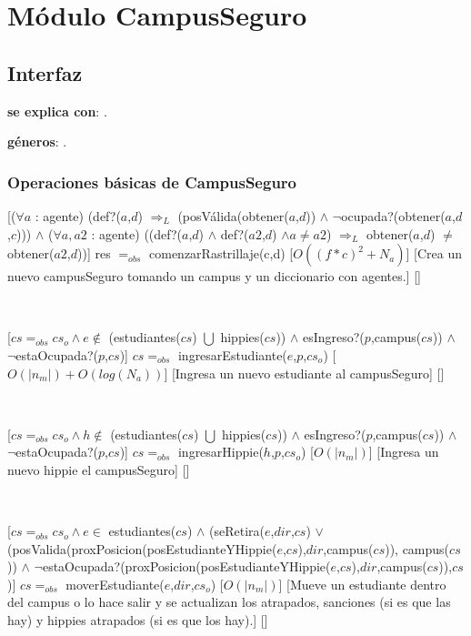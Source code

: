 \section{Módulo CampusSeguro}

\subsection{Interfaz}

\textbf{se explica con}: .

\textbf{géneros}: .

\subsubsection{Operaciones básicas de CampusSeguro}

[($\forall a$ : agente) (def?($a$,$d$) $\Rightarrow_L$ (posVálida(obtener($a$,$d$)) $\land$ $\neg$ocupada?(obtener($a$,$d$,$c$))) $\land$ ($\forall a, a2$ : agente) ((def?($a$,$d$) $\land$ def?($a2$,$d$) $\land a \neq a2$) $\Rightarrow_L$ obtener($a$,$d$) $\neq$ obtener($a2$,$d$))]
{res $=_{obs}$ comenzarRastrillaje(c,d)}
[$O((f*c)^2 + N_a)$]
[Crea un nuevo campusSeguro tomando un campus y un diccionario con agentes.]
[]

~

[$cs =_{obs} cs_o \land e \not\in$ (estudiantes($cs$) $\bigcup$ hippies($cs$)) $\land$ esIngreso?($p$,campus($cs$)) $\land$ $\neg$estaOcupada?($p$,$cs$)]
{$cs =_{obs}$ ingresarEstudiante($e$,$p$,$cs_o$)}
[$O(|n_m|) + O(log(N_a))$]
[Ingresa un nuevo estudiante al campusSeguro]
[]

~

[$cs =_{obs} cs_o \land h \not\in$ (estudiantes($cs$) $\bigcup$ hippies($cs$)) $\land$ esIngreso?($p$,campus($cs$)) $\land$ $\neg$estaOcupada?($p$,$cs$)]
{$cs =_{obs}$ ingresarHippie($h$,$p$,$cs_o$)}
[$O(|n_m|)$]
[Ingresa un nuevo hippie el campusSeguro]
[]

~

[$cs =_{obs} cs_o \land e \in$ estudiantes($cs$) $\land$ (seRetira($e$,$dir$,$cs$) $\lor$ \\
(posValida(proxPosicion(posEstudianteYHippie($e$,$cs$),$dir$,campus($cs$)), campus($cs$)) $\land$ $\neg$estaOcupada?(proxPosicion(posEstudianteYHippie($e$,$cs$),$dir$,campus($cs$)),$cs$)]
{$cs =_{obs}$ moverEstudiante($e$,$dir$,$cs_o$)}
[$O(|n_m|)$]
[Mueve un estudiante dentro del campus o lo hace salir y se actualizan los atrapados, sanciones (si es que las hay) y hippies atrapados (si es que los hay).]
[]


